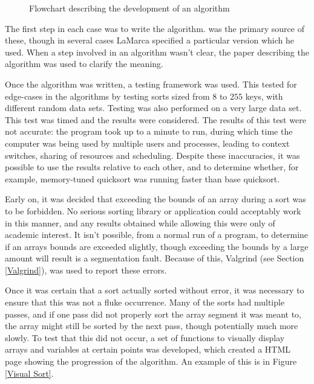 \begin{figure}
\caption{Flowchart describing the development of an algorithm}
\label{Flowchart}
\end{figure}


The first step in each case was to write the algorithm. \cite{Sedgewick02} was
the primary source of these, though in several cases LaMarca specified a
particular version which he used. When a step involved in an algorithm wasn't
clear, the paper describing the algorithm was used to clarify the meaning.

Once the algorithm was written, a testing framework was used. This tested for
edge-cases in the algorithms by testing sorts sized from $8$ to $255$ keys, with
different random data sets. Testing was also performed on a very large data set.
This test was timed and the results were considered. The results of this test
were not accurate: the program took up to a minute to run, during which time the
computer was being used by multiple users and processes, leading to context
switches, sharing of resources and scheduling. Despite these inaccuracies, it was
possible to use the results relative to each other, and to determine whether,
for example, memory-tuned quicksort was running faster than base quicksort.

Early on, it was decided that exceeding the bounds of an array
during a sort was to be forbidden. No serious sorting library or application
could acceptably work in this manner, and any results obtained while allowing
this were only of academic interest. It isn't possible, from a normal run of a
program, to determine if an arrays bounds are exceeded slightly, though exceeding
the bounds by a large amount will result is a segmentation fault. Because of
this, Valgrind (see Section \ref{Valgrind}), was used to report these errors.

Once it was certain that a sort actually sorted without error, it was necessary
to ensure that this was not a fluke occurrence. Many of the sorts had multiple
passes, and if one pass did not properly sort the array segment it was meant to,
the array might still be sorted by the next pass, though potentially much more
slowly. To test that this did not occur, a set of functions to visually display
arrays and variables at certain points was developed, which created a HTML page
showing the progression of the algorithm. An example of this is in Figure
\vref{Visual Sort}.

